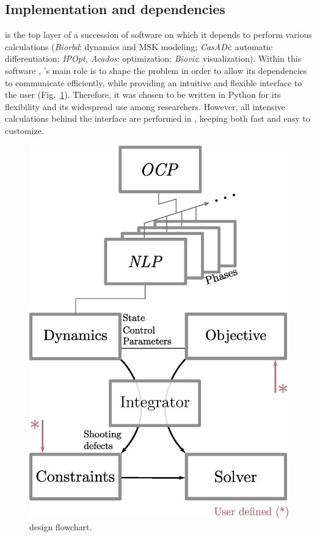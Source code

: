 \subsection{Implementation and dependencies}
\bioptim is the top layer of a succession of software on which it depends to perform various calculations (\textit{Biorbd}: dynamics and MSK modeling; \textit{CasADi}: automatic differentiation; \textit{IPOpt, Acados}: optimization; \textit{Bioviz}: visualization).
Within this software , \bioptim 's main role is to shape the problem in order to allow its dependencies to communicate efficiently, while providing an intuitive and flexible interface to the user (Fig.~\ref{fig:dependencies}).
Therefore, it was chosen to be written in Python for its flexibility and its widespread use among researchers.
However, all intensive calculations behind the interface are performed in , keeping \bioptim both fast and easy to customize.

\begin{figure}[t!]
\centering
\includegraphics[width=0.9\columnwidth]{figures/design.eps}
\caption{\bioptim design flowchart.}
\label{fig:dependencies}
\vspace*{-0.5cm}
\end{figure}


